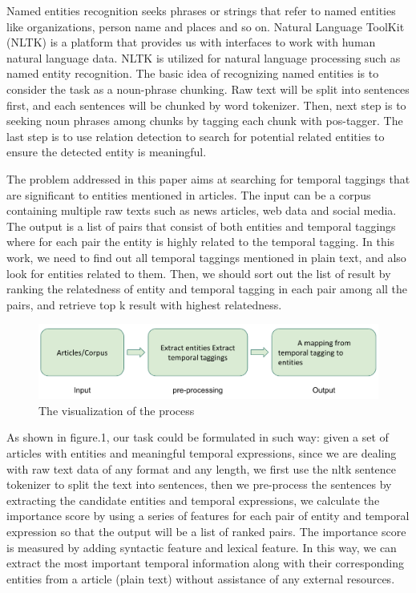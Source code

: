 \documentclass[12pt,a4paper]{article}
\begin{document}
Named entities recognition seeks phrases or strings that refer to named entities like organizations, person name and places and so on. Natural Language ToolKit (NLTK) \cite{nltk} is a platform that provides us with interfaces to work with human natural language data. NLTK is utilized for natural language processing such as named entity recognition. The basic idea of recognizing named entities is to consider the task as a noun-phrase chunking. Raw text will be split into sentences first, and each sentences will be chunked by word tokenizer. Then, next step is to seeking noun phrases among chunks by tagging each chunk with pos-tagger. The last step is to use relation detection to search for potential related entities to ensure the detected entity is meaningful.

The problem addressed in this paper aims at searching for temporal taggings that are significant to entities mentioned in articles. The input can be a corpus containing multiple raw texts such as news articles, web data and social media. The output is a list of pairs that consist of both entities and temporal taggings where for each pair the entity is highly related to the temporal tagging. In this work, we need to find out all temporal taggings mentioned in plain text, and also look for entities related to them. Then, we should sort out the list of result by ranking the relatedness of entity and temporal tagging in each pair among all the pairs, and retrieve top k result with highest relatedness.

\begin{figure}
    \includegraphics[width=\linewidth]{demo}
    \caption{The visualization of the process}
\end{figure}

As shown in figure.1, our task could be formulated in such way: given a set of articles with entities and meaningful temporal expressions, since we are dealing with raw text data of any format and any length, we first use the nltk sentence tokenizer \cite{nltk} to split the text into sentences, then we pre-process the sentences by extracting the candidate entities and temporal expressions, we calculate the importance score by using a series of features for each pair of entity and temporal expression so that the output will be a list of ranked pairs. The importance score is measured by adding syntactic feature and lexical feature. In this way, we can extract the most important temporal information along with their corresponding entities from a article (plain text) without assistance of any external resources.
\end{document}

